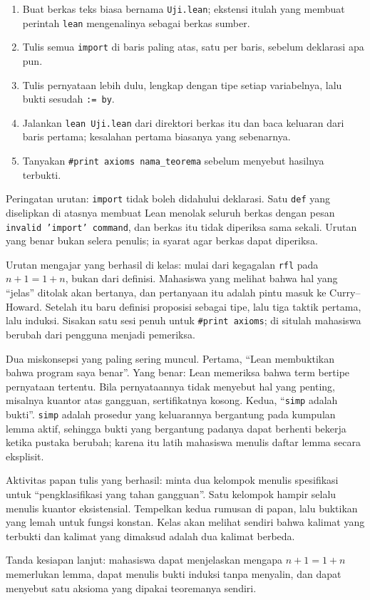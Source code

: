 \begin{resep}
\begin{enumerate}
  \item Buat berkas teks biasa bernama \texttt{Uji.lean}; ekstensi itulah yang membuat perintah
        \texttt{lean} mengenalinya sebagai berkas sumber.
  \item Tulis semua \texttt{import} di baris paling atas, satu per baris, sebelum deklarasi apa pun.
  \item Tulis pernyataan lebih dulu, lengkap dengan tipe setiap variabelnya, lalu bukti sesudah
        \texttt{:= by}.
  \item Jalankan \texttt{lean Uji.lean} dari direktori berkas itu dan baca keluaran dari baris
        pertama; kesalahan pertama biasanya yang sebenarnya.
  \item Tanyakan \texttt{\#print axioms nama\_teorema} sebelum menyebut hasilnya terbukti.
\end{enumerate}
Peringatan urutan: \texttt{import} tidak boleh didahului deklarasi. Satu \texttt{def} yang
diselipkan di atasnya membuat Lean menolak seluruh berkas dengan pesan
\texttt{invalid 'import' command}, dan berkas itu tidak diperiksa sama sekali. Urutan yang benar
bukan selera penulis; ia syarat agar berkas dapat diperiksa.
\end{resep}

\begin{untukdosen}
Urutan mengajar yang berhasil di kelas: mulai dari kegagalan \texttt{rfl} pada $n+1=1+n$, bukan
dari definisi. Mahasiswa yang melihat bahwa hal yang ``jelas'' ditolak akan bertanya, dan
pertanyaan itu adalah pintu masuk ke Curry--Howard. Setelah itu baru definisi proposisi sebagai
tipe, lalu tiga taktik pertama, lalu induksi. Sisakan satu sesi penuh untuk \texttt{\#print
axioms}; di situlah mahasiswa berubah dari pengguna menjadi pemeriksa.

Dua miskonsepsi yang paling sering muncul. Pertama, ``Lean membuktikan bahwa program saya benar''.
Yang benar: Lean memeriksa bahwa term bertipe pernyataan tertentu. Bila pernyataannya tidak
menyebut hal yang penting, misalnya kuantor atas gangguan, sertifikatnya kosong. Kedua,
``\texttt{simp} adalah bukti''. \texttt{simp} adalah prosedur yang keluarannya bergantung pada
kumpulan lemma aktif, sehingga bukti yang bergantung padanya dapat berhenti bekerja ketika pustaka
berubah; karena itu latih mahasiswa menulis daftar lemma secara eksplisit.

Aktivitas papan tulis yang berhasil: minta dua kelompok menulis spesifikasi untuk ``pengklasifikasi
yang tahan gangguan''. Satu kelompok hampir selalu menulis kuantor eksistensial. Tempelkan kedua
rumusan di papan, lalu buktikan yang lemah untuk fungsi konstan. Kelas akan melihat sendiri bahwa
kalimat yang terbukti dan kalimat yang dimaksud adalah dua kalimat berbeda.

Tanda kesiapan lanjut: mahasiswa dapat menjelaskan mengapa $n+1=1+n$ memerlukan lemma, dapat
menulis bukti induksi tanpa menyalin, dan dapat menyebut satu aksioma yang dipakai teoremanya
sendiri.
\end{untukdosen}

